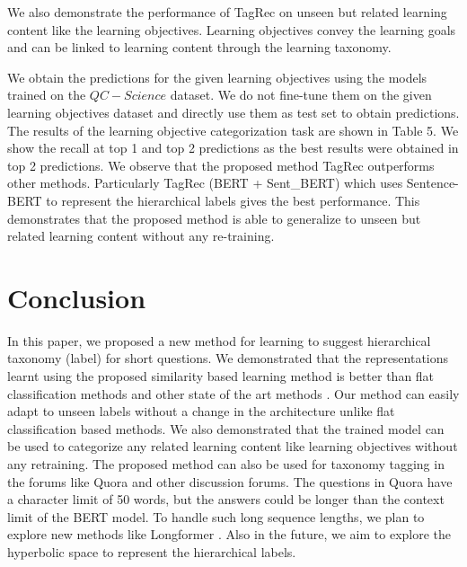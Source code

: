 \documentclass[runningheads, envcountsame, a4paper]{llncs}
\begin{document}
We also demonstrate the performance of TagRec on unseen but related learning content like the learning objectives. Learning objectives convey the learning goals and can be linked to learning content through the learning taxonomy.


We obtain the predictions for the given learning objectives using the models trained on the $QC-Science$ dataset. We do not fine-tune them on the given learning objectives dataset and directly use them as test set to obtain predictions. The results of the learning objective categorization task are shown in Table 5. We show the recall at top 1 and top 2 predictions as the best results were obtained in top 2 predictions. We observe that the proposed method TagRec outperforms other methods. Particularly TagRec (BERT + Sent\_BERT) which uses Sentence-BERT to represent the hierarchical labels gives the best performance. This demonstrates that the proposed method is able to generalize to unseen but related learning content without any re-training.
\section{Conclusion}
\setlength{\parindent}{0pt}
In this paper, we proposed a new method for learning to suggest hierarchical taxonomy (label) for short questions. We demonstrated that the representations learnt using the proposed similarity based learning method is better than flat classification methods and other state of the art methods \cite{twinbert}. Our method can easily adapt to unseen labels without a change in the architecture unlike flat classification based methods. We also demonstrated that the trained model can be used to categorize any related learning content like learning objectives without any retraining. The proposed method can also be used for taxonomy tagging in the forums like Quora and other discussion forums. The questions in Quora have a character limit of 50 words, but the answers could be longer than the context limit of the BERT model. To handle such long sequence lengths, we plan to explore new methods like Longformer \cite{beltagy2020longformer}. Also in the future, we aim to explore the hyperbolic space to represent the hierarchical labels.

\end{document}

